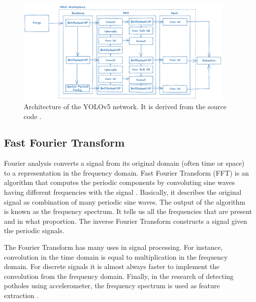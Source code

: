 \begin{figure}[ht]
\begin{center}
\includegraphics[width=0.95\textwidth,keepaspectratio]{images/2_literature/yolo-architecture.png}
\end{center}
\captionsetup{width=.90\textwidth}
\caption{Architecture of the YOLOv5 network. It is derived from the source code \cite{Jocher2021}.}
\label{fig:yolo-architecture}
\end{figure}




\subsection{Fast Fourier Transform}
\label{sec:fft}

Fourier analysis converts a signal from its original domain (often time or space) to a representation in the frequency domain. Fast Fourier Transform (FFT) is an algorithm that computes the periodic components by convoluting sine waves having different frequencies with the signal \cite{Cooley1965}. Basically, it describes the original signal as combination of many periodic sine waves. The output of the algorithm is known as the frequency spectrum. It tells us all the frequencies that are present and in what proportion. The inverse Fourier Transform constructs a signal given the periodic signals. 

The Fourier Transform has many uses in signal processing. For instance, convolution in the time domain is equal to multiplication in the frequency domain. For discrete signals it is almost always faster to implement the convolution from the frequency domain. Finally, in the research of detecting potholes using accelerometer, the frequency spectrum is used as feature extraction \cite{Wu2020}.


